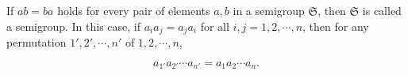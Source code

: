 If $ab = ba$ holds for every pair of elements $a, b$ in a semigroup $\mathfrak{S}$, then $\mathfrak{S}$ is called a  semigroup. In this case, if $a_i a_j = a_j a_i$ for all $i, j = 1, 2, \cdots, n$, then for any permutation $1', 2', \cdots, n'$ of $1, 2, \cdots, n$,

$$a_{1'} a_{2'} \cdots a_{n'} = a_1 a_2 \cdots a_n.$$
